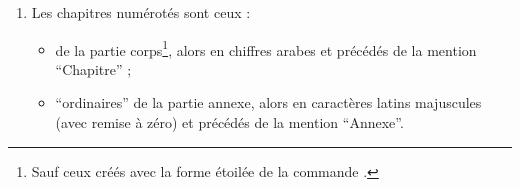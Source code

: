 \begin{enumerate}
\begin{itemize}
  \item sont imprimés sur (et seulement sur) les pages où les
    \glspl{titrecourant} sont activés et y figurent alors en haut, du côté des
    marges extérieures ;
  \item apparaissent tous dans le compteur de pages des afficheurs
    \pdf.
  \end{itemize}
\item Les chapitres numérotés sont ceux :
  \begin{itemize}
  \item de la partie corps\footnote{Sauf ceux créés avec la forme étoilée de la
      commande .}, alors en chiffres arabes et précédés de la
    mention \enquote{Chapitre} ;
  \item \enquote{ordinaires} de la partie annexe, alors en
    caractères latins majuscules (avec remise à zéro) et
    précédés de la mention \enquote{Annexe}.
  \end{itemize}
\end{enumerate}

%
\iffalse
\fi
